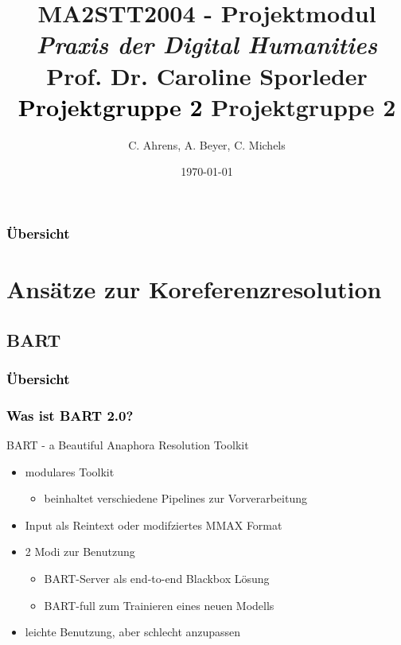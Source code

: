 \documentclass[xcolor=dvipsnames]{beamer}
\title{{\scriptsize{MA2STT2004 - Projektmodul\newline
\\\emph{Praxis der Digital Humanities}
\\Prof. Dr. Caroline Sporleder}}
\newline\\\textcolor{black}{\huge{Projektgruppe 2\newline
}}}
\author{C. Ahrens, A. Beyer, C. Michels}
\institute{Fachbereich II --  Computerlinguistik und Digital Humanities
\newline\\Universität Trier}
\date{\today}
\begin{document}
\begin{frame}[plain]
\titlepage
\end{frame}

\title{Projektgruppe 2}
\institute{}

\begin{frame}[plain]\frametitle{\textcolor{black}{Übersicht}}
\tableofcontents[hideallsubsections]
\end{frame}


\section{Ansätze zur Koreferenzresolution}


\subsection{BART}


\begin{frame}[plain]\frametitle{\textcolor{black}{Übersicht}}


\end{frame}

\addtocounter{framenumber}{-3}


\begin{frame}\frametitle{\textcolor{black}{Was ist BART 2.0?}}

\begin{block}{BART - a Beautiful Anaphora Resolution Toolkit}
\begin{itemize}
\item modulares Toolkit 
\begin{itemize}
\item beinhaltet verschiedene Pipelines zur Vorverarbeitung
\end{itemize}
\item Input als Reintext oder modifziertes MMAX Format
\item 2 Modi zur Benutzung
\begin{itemize}
\item BART-Server als end-to-end Blackbox Lösung
\item BART-full zum Trainieren eines neuen Modells
\end{itemize}
\item leichte Benutzung, aber schlecht anzupassen
\end{itemize}
\end{block}

\end{frame}
\end{document}
